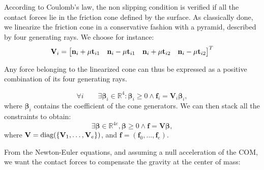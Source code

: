 According to Coulomb's law, the non slipping condition is verified if all the contact forces lie in the friction cone defined by the surface.
As classically done, we linearize the friction cone in a conservative fashion with a pyramid, described by four generating rays. We choose for instance:
\begin{equation*}
\mathbf{V}_{i} = \begin{bmatrix}\mathbf{n}_{i} + \mu \mathbf{t}_{i1} & \mathbf{n}_{i} -\mu \mathbf{t}_{i1} & \mathbf{n}_{i} + \mu \mathbf{t}_{i2} & \mathbf{n}_{i} - \mu \mathbf{t}_{i2}\end{bmatrix}^T
\end{equation*}

Any force belonging to the linearized cone
can thus be expressed as a positive combination of its four generating rays.

\begin{equation*}
\forall i  \qquad  \exists \bm{\beta}_i \in \mathbb{R}^{4} : \bm{\beta}_i \ge 0 \wedge \mathbf{f}_{i} = \mathbf{V}_{i} \bm{\beta}_i,
\end{equation*}
where $\bm{\beta}_i$ contains the coefficient of the cone generators.
We can then stack all the constraints to obtain:
\begin{equation}\label{eq:gen}
\exists \bm{\beta} \in \mathbb{R}^{4e} ,  \bm{\beta} \ge 0 \wedge \mathbf{f} = \mathbf{V} \bm{\beta},
\end{equation}
where $\mathbf{V} = \text{diag}( \{\mathbf{V}_1, \dots, \mathbf{V}_e\} )$, and $\mathbf{f} = (\mathbf{f}_0,...,\mathbf{f}_e)$.

From the Newton-Euler equations, and assuming a null acceleration of the COM, we want the contact forces to compensate the gravity at the center of mass:



